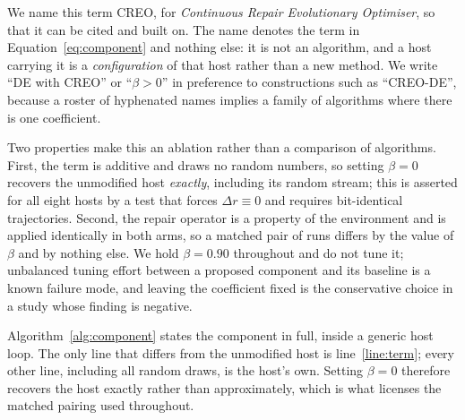 \documentclass[11pt,a4paper]{article}
\begin{document}
We name this term CREO, for \emph{Continuous Repair Evolutionary Optimiser}, so that it
can be cited and built on. The name denotes the term in Equation~\ref{eq:component} and
nothing else: it is not an algorithm, and a host carrying it is a \emph{configuration} of
that host rather than a new method. We write ``DE with
CREO'' or ``$\beta > 0$'' in preference to constructions such as ``CREO-DE'', because a
roster of hyphenated names implies a family of algorithms where there is one coefficient.

Two properties make this an ablation rather than a comparison of algorithms. First, the
term is additive and draws no random numbers, so setting $\beta = 0$ recovers the
unmodified host \emph{exactly}, including its random stream; this is asserted for all
eight hosts by a test that forces $\Delta r \equiv 0$ and requires bit-identical
trajectories. Second, the repair operator is a property of the environment and is applied
identically in both arms, so a matched pair of runs differs by the value of $\beta$ and
by nothing else. We hold $\beta = 0.90$ throughout and do not tune it; unbalanced tuning
effort between a proposed component and its baseline is a known failure mode, and leaving
the coefficient fixed is the conservative choice in a study whose finding is negative.

Algorithm~\ref{alg:component} states the component in full, inside a generic host loop.
The only line that differs from the unmodified host is line~\ref{line:term}; every other
line, including all random draws, is the host's own. Setting $\beta = 0$ therefore
recovers the host exactly rather than approximately, which is what licenses the matched
pairing used throughout.
\end{document}
